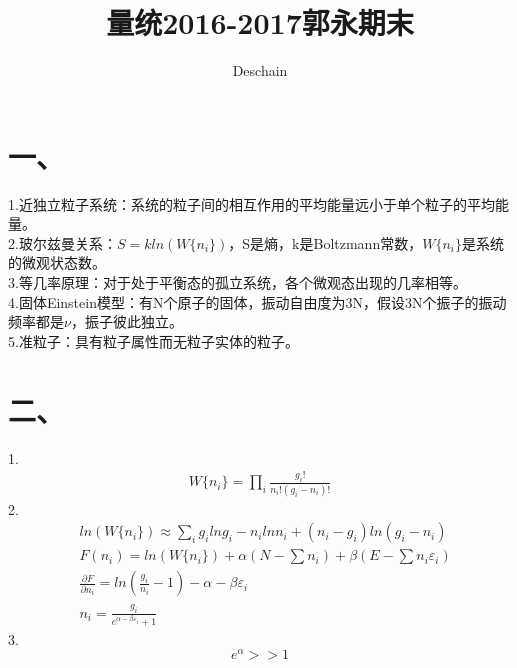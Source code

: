 \documentclass[UTF8]{ctexart}
\title{量统2016-2017郭永期末}
\author{Deschain}
\begin{document}
\maketitle
\section*{一、}
1.近独立粒子系统：系统的粒子间的相互作用的平均能量远小于单个粒子的平均能量。\\
2.玻尔兹曼关系：$S=kln(W\{n_i\})$，S是熵，k是Boltzmann常数，$W\{n_i\}$是系统的微观状态数。\\
3.等几率原理：对于处于平衡态的孤立系统，各个微观态出现的几率相等。\\
4.固体Einstein模型：有N个原子的固体，振动自由度为3N，假设3N个振子的振动频率都是$\nu$，振子彼此独立。\\
5.准粒子：具有粒子属性而无粒子实体的粒子。
\section*{二、}
1.
\begin{equation*}
  \begin{aligned}
    W\{n_i\}=\prod\limits_i\frac{g_i!}{n_i!(g_i-n_i)!}
  \end{aligned}
\end{equation*}
2.
\begin{equation*}
  \begin{aligned}
     & ln(W\{n_i\})\approx\sum\limits_i g_ilng_i-n_ilnn_i+(n_i-g_i)ln(g_i-n_i)         \\
     & F(n_i)=ln(W\{n_i\})+\alpha(N-\sum n_i)+\beta(E-\sum n_i\varepsilon_i)           \\
     & \frac{\partial F}{\partial n_i}=ln(\frac{g_i}{n_i}-1)-\alpha-\beta\varepsilon_i \\
     & n_i=\frac{g_i}{e^{\alpha-\beta\varepsilon_i}+1}
  \end{aligned}
\end{equation*}
3.
\begin{equation*}
  e^\alpha>>1
\end{equation*}
\end{document}
